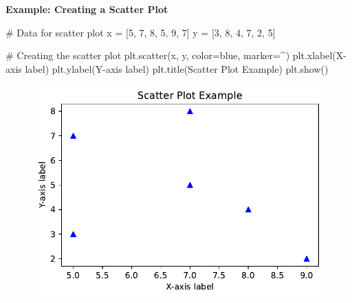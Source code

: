 \documentclass[
  letterpaper,
  DIV=11,
  numbers=noendperiod]{scrreprt}
\newenvironment{Shaded}{\begin{snugshade}}{\end{snugshade}}
\newcommand{\CommentTok}[1]{\textcolor[rgb]{0.37,0.37,0.37}{#1}}
\newcommand{\DecValTok}[1]{\textcolor[rgb]{0.68,0.00,0.00}{#1}}
\newcommand{\NormalTok}[1]{\textcolor[rgb]{0.00,0.23,0.31}{#1}}
\newcommand{\OperatorTok}[1]{\textcolor[rgb]{0.37,0.37,0.37}{#1}}
\newcommand{\StringTok}[1]{\textcolor[rgb]{0.13,0.47,0.30}{#1}}
\begin{document}
\textbf{Example: Creating a Scatter Plot}

\begin{Shaded}
\begin{Highlighting}[]
\CommentTok{\# Data for scatter plot}
\NormalTok{x }\OperatorTok{=}\NormalTok{ [}\DecValTok{5}\NormalTok{, }\DecValTok{7}\NormalTok{, }\DecValTok{8}\NormalTok{, }\DecValTok{5}\NormalTok{, }\DecValTok{9}\NormalTok{, }\DecValTok{7}\NormalTok{]}
\NormalTok{y }\OperatorTok{=}\NormalTok{ [}\DecValTok{3}\NormalTok{, }\DecValTok{8}\NormalTok{, }\DecValTok{4}\NormalTok{, }\DecValTok{7}\NormalTok{, }\DecValTok{2}\NormalTok{, }\DecValTok{5}\NormalTok{]}

\CommentTok{\# Creating the scatter plot}
\NormalTok{plt.scatter(x, y, color}\OperatorTok{=}\StringTok{\textquotesingle{}blue\textquotesingle{}}\NormalTok{, marker}\OperatorTok{=}\StringTok{\textquotesingle{}\^{}\textquotesingle{}}\NormalTok{)}
\NormalTok{plt.xlabel(}\StringTok{\textquotesingle{}X{-}axis label\textquotesingle{}}\NormalTok{)}
\NormalTok{plt.ylabel(}\StringTok{\textquotesingle{}Y{-}axis label\textquotesingle{}}\NormalTok{)}
\NormalTok{plt.title(}\StringTok{\textquotesingle{}Scatter Plot Example\textquotesingle{}}\NormalTok{)}
\NormalTok{plt.show()}
\end{Highlighting}
\end{Shaded}

\begin{figure}[H]

{\centering \includegraphics{15_Data_Vis_files/figure-pdf/cell-4-output-1.pdf}

}

\end{figure}
\end{document}
